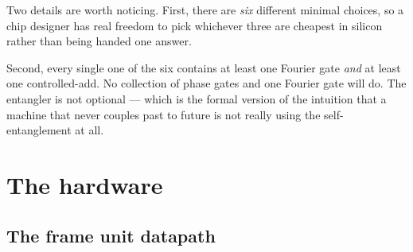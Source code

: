 
\begin{plain}
Two details are worth noticing. First, there are \emph{six} different minimal choices, so
a chip designer has real freedom to pick whichever three are cheapest in silicon rather
than being handed one answer.

Second, every single one of the six contains at least one Fourier gate \emph{and} at
least one controlled-add. No collection of phase gates and one Fourier gate will do. The
entangler is not optional --- which is the formal version of the intuition that a machine
that never couples past to future is not really using the self-entanglement at all.
\end{plain}

\section{The hardware}\label{sec:hardware}

\subsection{The frame unit datapath}

